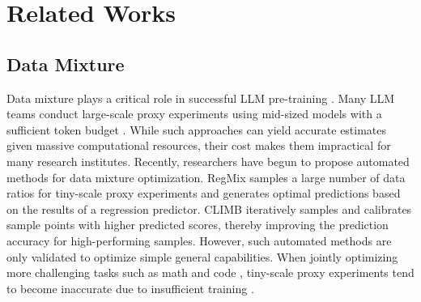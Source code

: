 \section{Related Works}
\subsection{Data Mixture} 
Data mixture plays a critical role in successful LLM pre-training \cite{chen2023skill, shen2023slimpajama, ye2024data, xie2023doremi}. Many LLM teams conduct large-scale proxy experiments using mid-sized models with a sufficient token budget \cite{li2025minimax, nie2025large, blakeman2025nemotron}. While such approaches can yield accurate estimates given massive computational resources, their cost makes them impractical for many research institutes. Recently, researchers have begun to propose automated methods for data mixture optimization. RegMix \cite{liu2024regmix} samples a large number of data ratios for tiny-scale proxy experiments and generates optimal predictions based on the results of a regression predictor. CLIMB \cite{diao2025climb} iteratively samples and calibrates sample points with higher predicted scores, thereby improving the prediction accuracy for high-performing samples. However, such automated methods are only validated to optimize simple general capabilities. When jointly optimizing more challenging tasks such as math and code \cite{team2025kimi, feng2024maximize, basant2025nvidia}, tiny-scale proxy experiments tend to become inaccurate due to insufficient training \cite{allal2025_the_smol_training_playbook_the_secrets_to_building_world_class_llms, li2025minimax}.

